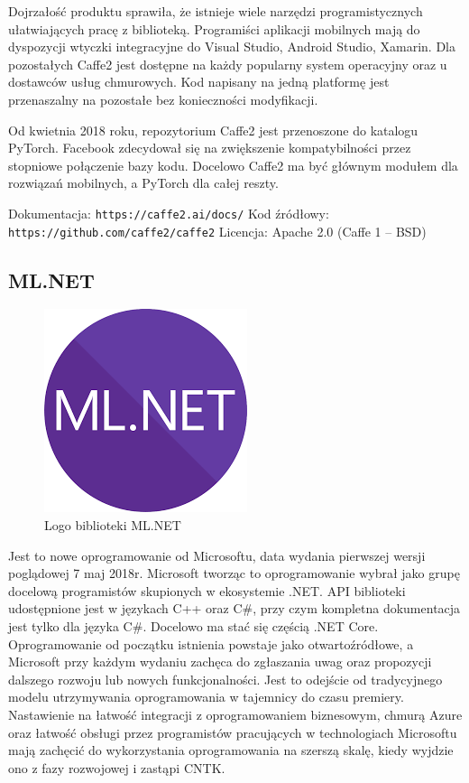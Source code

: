 \documentclass[12pt,a4paper,twoside,titlepage,openright]{book}
\begin{document}
Dojrzałość produktu sprawiła, że istnieje wiele narzędzi programistycznych ułatwiających pracę z biblioteką. Programiści aplikacji mobilnych mają do dyspozycji wtyczki integracyjne do Visual Studio, Android Studio, Xamarin. Dla pozostałych Caffe2 jest dostępne na każdy popularny system operacyjny oraz u dostawców usług chmurowych. Kod napisany na jedną platformę jest przenaszalny na pozostałe bez konieczności modyfikacji.

Od kwietnia 2018 roku, repozytorium Caffe2 jest przenoszone do katalogu PyTorch. Facebook zdecydował się na zwiększenie kompatybilności przez stopniowe połączenie bazy kodu. Docelowo Caffe2 ma być głównym modułem dla rozwiązań mobilnych, a PyTorch dla całej reszty.

\noindent
\newline
Dokumentacja: \texttt{https://caffe2.ai/docs/}
\newline
Kod źródłowy: \texttt{https://github.com/caffe2/caffe2}
\newline
Licencja: Apache 2.0 (Caffe 1 -- BSD)


\subsection{ML.NET}
\begin{figure}[h]
	\centering
			\includegraphics[resolution=100, scale=1]{ML_NET.png}
		\caption{Logo biblioteki ML.NET}
\end{figure}
Jest to nowe oprogramowanie od Microsoftu, data wydania pierwszej wersji poglądowej 7 maj 2018r. Microsoft tworząc to oprogramowanie wybrał jako grupę docelową programistów skupionych w ekosystemie .NET. API biblioteki udostępnione jest w językach C++ oraz C\#, przy czym kompletna dokumentacja jest tylko dla języka C\#. Docelowo ma stać się częścią .NET Core. Oprogramowanie od początku istnienia powstaje jako otwartoźródłowe, a Microsoft przy każdym wydaniu zachęca do zgłaszania uwag oraz propozycji dalszego rozwoju lub nowych funkcjonalności. Jest to odejście od tradycyjnego modelu utrzymywania oprogramowania w tajemnicy do czasu premiery. Nastawienie na łatwość integracji z oprogramowaniem biznesowym, chmurą Azure oraz łatwość obsługi przez programistów pracujących w technologiach Microsoftu mają zachęcić do wykorzystania oprogramowania na szerszą skalę, kiedy wyjdzie ono z fazy rozwojowej i zastąpi CNTK.
\end{document}

